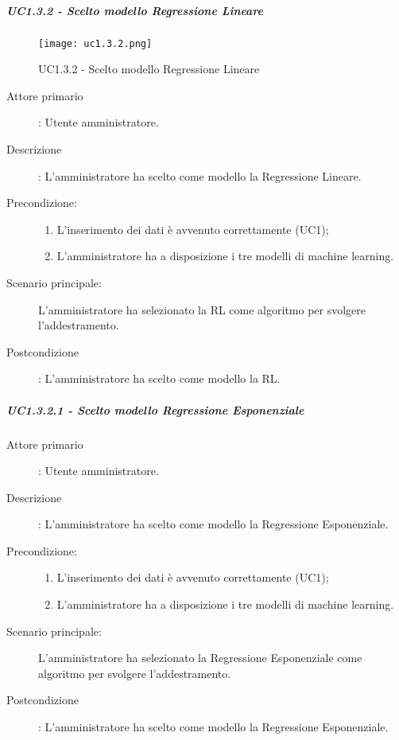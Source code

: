 \newpage

\subparagraph{UC1.3.2 - Scelto modello Regressione Lineare}%
\label{sssec:uc1.3.2}

\begin{figure}[h!]
  \begin{center}
    \texttt{[image: uc1.3.2.png]}\\
    \caption{UC1.3.2 - Scelto modello Regressione Lineare}%
    \label{fig:uc1.3.2}
  \end{center}
  \end{figure}

\begin{description}
  \item[Attore primario]: Utente amministratore.
  \item[Descrizione]: L'amministratore ha scelto come modello la Regressione Lineare.
  \item[Precondizione:]
  \begin{enumerate}
    \item L'inserimento dei dati è avvenuto correttamente (UC1);
    \item L'amministratore ha a disposizione i tre modelli di machine learning.
  \end{enumerate}
  \item[Scenario principale:] L'amministratore ha selezionato la RL come algoritmo per svolgere l'addestramento.
  \item[Postcondizione]: L'amministratore ha scelto come modello la RL.
\end{description}

\subparagraph*{UC1.3.2.1 - Scelto modello Regressione Esponenziale}
\label{sssec:uc1.3.2.1}
\begin{description}
  \item[Attore primario]: Utente amministratore.
  \item[Descrizione]: L'amministratore ha scelto come modello la Regressione Esponenziale.
  \item[Precondizione:]
  \begin{enumerate}
    \item L'inserimento dei dati è avvenuto correttamente (UC1);
    \item L'amministratore ha a disposizione i tre modelli di machine learning.
  \end{enumerate}
  \item[Scenario principale:] L'amministratore ha selezionato la Regressione Esponenziale come algoritmo per svolgere l'addestramento.
  \item[Postcondizione]: L'amministratore ha scelto come modello la Regressione Esponenziale.
\end{description}

